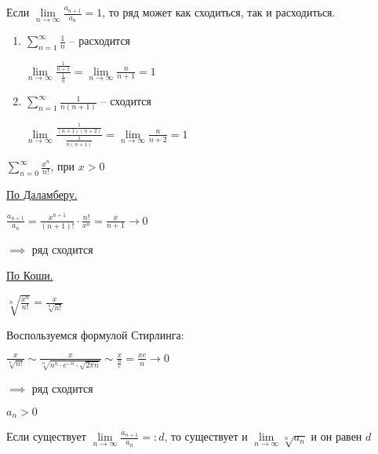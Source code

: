 \begin{remark}\thmslashn
	
	Если $\lim\limits_{n \to \infty} \frac{a_{n+1}}{a_n} = 1$, то ряд может как сходиться, так и расходиться.

	\begin{enumerate}

		\item $\sum\limits_{n = 1}^{\infty} \frac1n$ -- расходится

		$\lim\limits_{n \to \infty} \frac{\frac 1{n+1}}{\frac 1n} = \lim\limits_{n \to \infty} \frac n{n+1} = 1$

		\item $\sum\limits_{n = 1}^{\infty} \frac1{n(n+1)}$ -- сходится
	
		$\lim\limits_{n \to \infty} \frac{\frac 1{(n+1)(n+2)}}{\frac 1{n(n+1)}} = \lim\limits_{n \to \infty} \frac n{n+2} = 1$
	\end{enumerate}
\end{remark}

\begin{example}\thmslashn
	
	$\sum\limits_{n = 0}^{\infty} \frac{x^n}{n!}$, при $x > 0$
	
	\underline{По Даламберу.}

	 $\frac{a_{n+1}}{a_n} = \frac{x^{n+1}}{(n+1)!} \cdot \frac{n!}{x^n} = \frac{x}{n+1} \to 0$
	
	$\implies $ ряд сходится
	
	\underline {По Коши.}
	
	$\sqrt[n]{\frac{x^n}{n!}} = \frac{x}{\sqrt[n]{n!}}$ 

	Воспользуемся формулой Стирлинга:

	$ \frac{x}{\sqrt[n]{n!}} \sim \frac{x}{\sqrt[n]{n^n\cdot e^{-n} \cdot \sqrt{2\pi n}}}\sim \frac x {\frac ne} = \frac{xe}{n} \to 0$

	$\implies $ ряд сходится
\end{example}

\begin{theorem}\thmslashn
	
	$a_n > 0$
	
	Если существует $\lim\limits_{n \to \infty} \frac{a_{n+1}}{a_n} =: d$, то существует и $\lim\limits_{n \to \infty} \sqrt[n]{a_n}$ и он равен $d$
\end{theorem}

